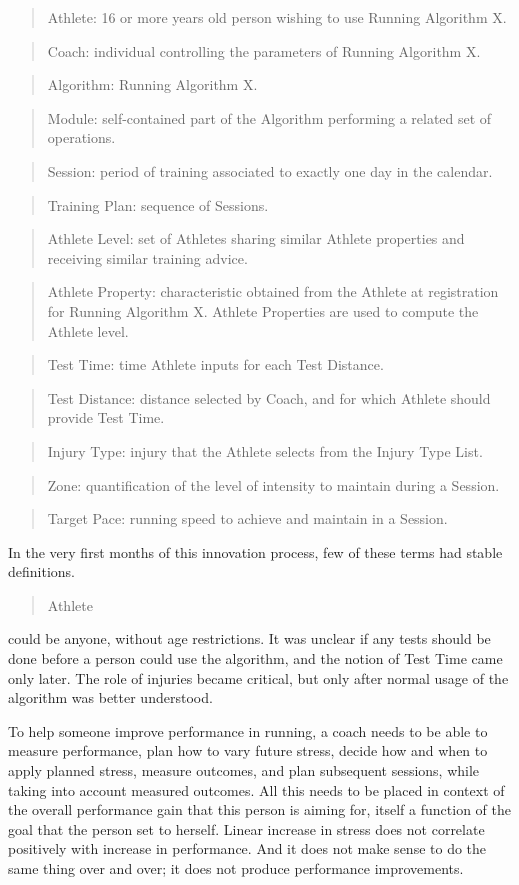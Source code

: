 \documentclass[graybox,envcountchap,sectrefs]{svmono}
\newcommand{\newterm}[1]{\begin{quote}\textsf{#1}\end{quote}}
\newcommand{\nterm}[1]{\textsf{#1}}
\begin{document}
\newterm{Athlete: 16 or more years old person wishing to use Running Algorithm X.}

\newterm{Coach: individual controlling the parameters of Running Algorithm X.}

\newterm{Algorithm: Running Algorithm X.}

\newterm{Module: self-contained part of the Algorithm performing a related set of operations.}

\newterm{Session: period of training associated to exactly one day in the calendar.}

\newterm{Training Plan: sequence of Sessions.}

\newterm{Athlete Level: set of Athletes sharing similar Athlete properties and receiving similar training advice.}

\newterm{Athlete Property: characteristic obtained from the Athlete at registration for Running Algorithm X. Athlete Properties are used to compute the Athlete level.}

\newterm{Test Time: time Athlete inputs for each Test Distance.}

\newterm{Test Distance: distance selected by Coach, and for which Athlete should provide Test Time.}

\newterm{Injury Type: injury that the Athlete selects from the Injury Type List.}

\newterm{Zone: quantification of the level of intensity to maintain during a Session.}

\newterm{Target Pace: running speed to achieve and maintain in a Session.}

In the very first months of this innovation process, few of these terms had stable definitions. \newterm{Athlete} could be anyone, without age restrictions. It was unclear if any tests should be done before a person could use the algorithm, and the notion of \nterm{Test Time} came only later. The role of injuries became critical, but only after normal usage of the algorithm was better understood. 

To help someone improve performance in running, a coach needs to be able to measure performance, plan how to vary future stress, decide how and when to apply planned stress, measure outcomes, and plan subsequent sessions, while taking into account measured outcomes. All this needs to be placed in context of the overall performance gain that this person is aiming for, itself a function of the goal that the person set to herself. Linear increase in stress does not correlate positively with increase in performance. And it does not make sense to do the same thing over and over; it does not produce performance improvements.
\end{document}
